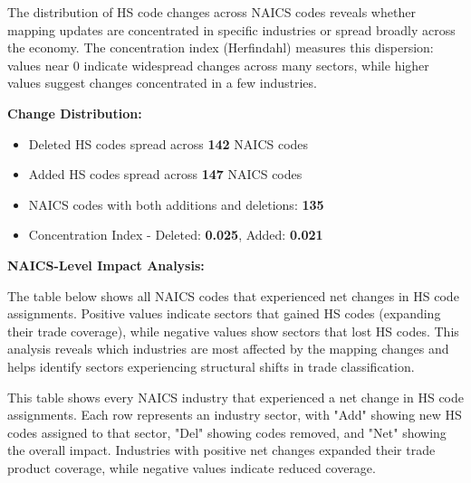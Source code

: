 \documentclass[11pt]{article}
\begin{document}
The distribution of HS code changes across NAICS codes reveals whether mapping updates are concentrated in specific industries or spread broadly across the economy. The concentration index (Herfindahl) measures this dispersion: values near 0 indicate widespread changes across many sectors, while higher values suggest changes concentrated in a few industries.

\textbf{Change Distribution:}
\begin{itemize}
    \item Deleted HS codes spread across \textbf{142} NAICS codes
    \item Added HS codes spread across \textbf{147} NAICS codes
    \item NAICS codes with both additions and deletions: \textbf{135}
    \item Concentration Index - Deleted: \textbf{0.025}, Added: \textbf{0.021}
\end{itemize}

\textbf{NAICS-Level Impact Analysis:}

The table below shows all NAICS codes that experienced net changes in HS code assignments. Positive values indicate sectors that gained HS codes (expanding their trade coverage), while negative values show sectors that lost HS codes. This analysis reveals which industries are most affected by the mapping changes and helps identify sectors experiencing structural shifts in trade classification.


This table shows every NAICS industry that experienced a net change in HS code assignments. Each row represents an industry sector, with "Add" showing new HS codes assigned to that sector, "Del" showing codes removed, and "Net" showing the overall impact. Industries with positive net changes expanded their trade product coverage, while negative values indicate reduced coverage.
\end{document}
